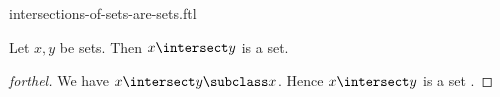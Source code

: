 \documentclass{stex}
\begin{document}
\begin{smodule}{intersections-of-sets-are-sets.ftl}


\begin{proposition}[forthel,id=IntersectsOfSetsAreSetsProp]
  Let $x, y$ be sets.
  Then $x \intersect y$ is a set.
\end{proposition}
\begin{proof}[forthel]
  We have $x \intersect y \subclass x$.
  Hence $x \intersect y$ is a set .
\end{proof}

\end{smodule}
\end{document}
